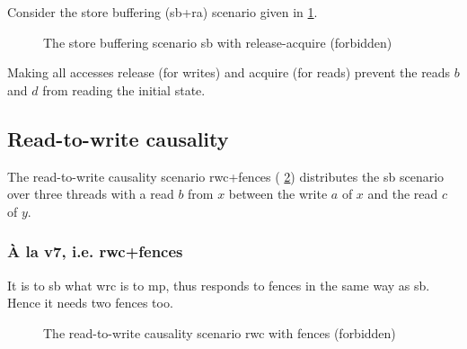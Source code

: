 \documentclass[a4paper]{article}
\begin{document}
Consider the store buffering (\textsf{sb+ra}) scenario given in
\myfig\ref{fig:sb-ra}.

\begin{figure}[!h]
\begin{center}
\end{center}
\vspace*{-5mm}
\caption{The store buffering scenario \textsf{sb} with release-acquire (forbidden)
\label{fig:sb-ra}}
\end{figure}

Making all accesses release (for writes) and acquire (for reads) prevent the
reads $b$ and $d$ from reading the initial state.


\clearpage

\subsection{Read-to-write causality}

The read-to-write causality scenario \textsf{rwc+fences} (\cf
\myfig\ref{fig:rwc}) distributes the \textsf{sb} scenario over three threads
with a read $b$ from $x$ between the write $a$ of $x$ and the read $c$ of $y$.

\subsubsection{\`A la v7, i.e. \textsf{rwc+fences}}

It is to \textsf{sb} what \textsf{wrc} is to \textsf{mp}, thus responds to
fences in the same way as \textsf{sb}. Hence it needs two fences too.

\begin{figure}[!h]
\begin{center}
\end{center}
\vspace*{-5mm}
\caption{The read-to-write causality scenario \textsf{rwc} with fences (forbidden) \label{fig:rwc}}
\end{figure}
\end{document}
